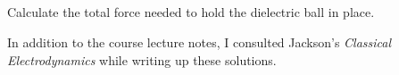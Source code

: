 \documentclass[11pt]{article}
\newenvironment{problem}
{
	\subsection{}
	\color{darkgray}
    \ignorespaces
}
{

}
\begin{document}
\begin{problem}
	Calculate the total force needed to hold the dielectric ball in place.
\end{problem}



\vfill
In addition to the course lecture notes, I consulted Jackson's \emph{Classical Electrodynamics} while writing up these solutions.
\end{document}
